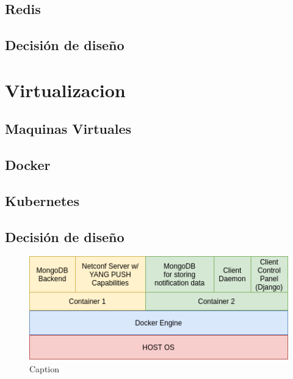 \subsection{Redis} 
\subsection{Decisión de diseño}


\section{Virtualizacion}
  \subsection{Maquinas Virtuales}
  \subsection{Docker}
  \subsection{Kubernetes}
\subsection{Decisión de diseño}

\begin{figure}
    \centering
    \includegraphics{graphics/docker.png}
    \caption{Caption}
    \label{fig:my_label}
\end{figure}
